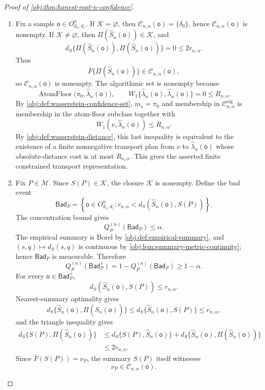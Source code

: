 \begin{proof}[Proof of \cref{obj:thm:honest-root-n-confidence}]
\begin{enumerate}
\item Fix a sample \(\mathsf o\in O_{d_x,d_z}^{n}\).  If \(\mathcal K=\varnothing\), then \(\mathcal C_{n,\alpha}(\mathsf o)=\{\delta_0\}\), hence \(\mathcal C_{n,\alpha}(\mathsf o)\) is nonempty.  If \(\mathcal K\ne\varnothing\), then \(\Pi(\widehat S_n(\mathsf o))\in\mathcal K\), and
\[
d_S\{\Pi(\widehat S_n(\mathsf o)),\Pi(\widehat S_n(\mathsf o))\}
=0
\le 2r_{n,\alpha}.
\]
Thus
\[
\overline F\{\Pi(\widehat S_n(\mathsf o))\}\in\mathcal C_{n,\alpha}(\mathsf o),
\]
so \(\mathcal C_{n,\alpha}(\mathsf o)\) is nonempty.  The algorithmic set is nonempty because
\[
\operatorname{AtomFloor}\bigl(\pi_0,\widehat\lambda_n(\mathsf o)\bigr),
\qquad
W_1\{\widehat\lambda_n(\mathsf o),\widehat\lambda_n(\mathsf o)\}=0\le R_{n,\alpha}.
\]
By \cref{obj:def:wasserstein-confidence-set}, \(m_\star=\pi_0\) and membership in \(\mathcal C^{\mathrm{alg}}_{n,\alpha}\) is membership in the atom-floor subclass together with
\[
W_1(\nu,\widehat\lambda_n(\mathsf o))\le R_{n,\alpha}.
\]
By \cref{obj:def:wasserstein-distance}, this last inequality is equivalent to the existence of a finite nonnegative transport plan from \(\nu\) to \(\widehat\lambda_n(\mathsf o)\) whose absolute-distance cost is at most \(R_{n,\alpha}\).  This gives the asserted finite constrained transport representation.  %

\item Fix \(P\in\mathcal M\).  Since \(S(P)\in\mathcal K\), the closure \(\mathcal K\) is nonempty.  Define the bad event
\[
\mathsf{Bad}_P
=
\left\{
\mathsf o\in O_{d_x,d_z}^{n}:
r_{n,\alpha}<d_S(\widehat S_n(\mathsf o),S(P))
\right\}.
\]
The concentration bound gives
\[
Q_P^{(n)}(\mathsf{Bad}_P)\le \alpha .
\]
The empirical summary is Borel by \cref{obj:def:empirical-summary}, and \((s,q)\mapsto d_S(s,q)\) is continuous by \cref{obj:lem:summary-metric-continuity}; hence \(\mathsf{Bad}_P\) is measurable.  Therefore
\[
Q_P^{(n)}(\mathsf{Bad}_P^{\,c})
=
1-Q_P^{(n)}(\mathsf{Bad}_P)
\ge 1-\alpha .
\]
For every \(\mathsf o\in\mathsf{Bad}_P^{\,c}\),
\[
d_S(\widehat S_n(\mathsf o),S(P))\le r_{n,\alpha}.
\]
Nearest-summary optimality gives
\[
d_S\{\widehat S_n(\mathsf o),\Pi(\widehat S_n(\mathsf o))\}
\le
d_S\{\widehat S_n(\mathsf o),S(P)\}
\le r_{n,\alpha},
\]
and the triangle inequality gives
\[
\begin{aligned}
d_S\{S(P),\Pi(\widehat S_n(\mathsf o))\}
&\le
d_S\{S(P),\widehat S_n(\mathsf o)\}
+
d_S\{\widehat S_n(\mathsf o),\Pi(\widehat S_n(\mathsf o))\}  \\
&\le 2r_{n,\alpha}.
\end{aligned}
\]
Since \(\overline F(S(P))=\nu_P\), the summary \(S(P)\) itself witnesses
\[
\nu_P\in\mathcal C_{n,\alpha}(\mathsf o).
\]


\end{enumerate}
\end{proof}
